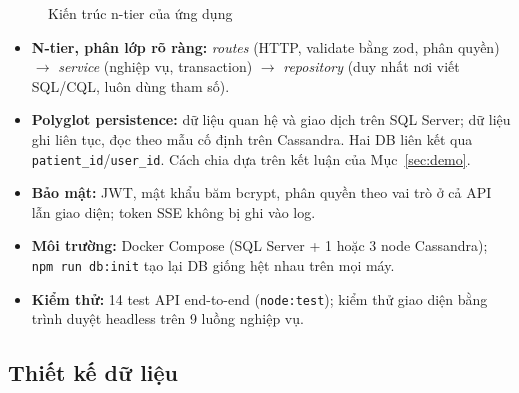 \begin{figure}[H]
\centering
{}
\caption{Kiến trúc n-tier của ứng dụng}
\label{fig:arch}
\end{figure}

\begin{itemize}
    \item \textbf{N-tier, phân lớp rõ ràng:} \textit{routes} (HTTP, validate bằng zod, phân quyền) $\rightarrow$ \textit{service} (nghiệp vụ, transaction) $\rightarrow$ \textit{repository} (duy nhất nơi viết SQL/CQL, luôn dùng tham số).
    \item \textbf{Polyglot persistence:} dữ liệu quan hệ và giao dịch trên SQL Server; dữ liệu ghi liên tục, đọc theo mẫu cố định trên Cassandra. Hai DB liên kết qua \texttt{patient\_id}/\texttt{user\_id}. Cách chia dựa trên kết luận của Mục~\ref{sec:demo}.
    \item \textbf{Bảo mật:} JWT, mật khẩu băm bcrypt, phân quyền theo vai trò ở cả API lẫn giao diện; token SSE không bị ghi vào log.
    \item \textbf{Môi trường:} Docker Compose (SQL Server + 1 hoặc 3 node Cassandra); \texttt{npm run db:init} tạo lại DB giống hệt nhau trên mọi máy.
    \item \textbf{Kiểm thử:} 14 test API end-to-end (\texttt{node:test}); kiểm thử giao diện bằng trình duyệt headless trên 9 luồng nghiệp vụ.
\end{itemize}

\subsection{Thiết kế dữ liệu}

